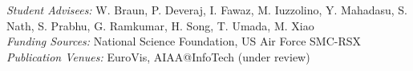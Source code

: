\documentclass[11pt]{article}
\begin{document}


\emph{Student Advisees: } W. Braun, P. Deveraj, I. Fawaz, M. Iuzzolino, Y. Mahadasu, S. Nath, S. Prabhu, G. Ramkumar, H. Song, T. Umada, M. Xiao\\
\emph{Funding Sources:} National Science Foundation, US Air Force SMC-RSX\\
\emph{Publication Venues:} EuroVis, AIAA@InfoTech (under review)
\end{document}
